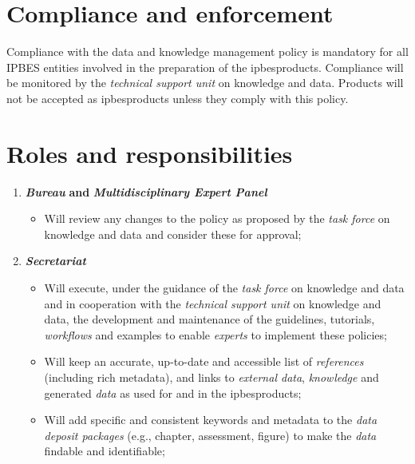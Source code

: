 \documentclass{article}
\begin{document}
\section{Compliance and enforcement}

Compliance with the data and knowledge management policy is mandatory for all IPBES entities involved in the preparation of the \gls{ipbesproducts}. Compliance will be monitored by the \textit{technical support unit} on knowledge and data. Products will not be accepted as \gls{ipbesproducts} unless they comply with this policy.

\section{Roles and responsibilities}

\begin{enumerate}[label=(\alph*)]
    \item \textit{\textbf{Bureau }}\textbf{and }\textit{\textbf{Multidisciplinary Expert Panel}}
    \begin{itemize}
        \item Will review any changes to the policy as proposed by the \textit{task force} on knowledge and data and consider these for approval;
    \end{itemize}

    \item \textit{\textbf{Secretariat}}
    \begin{itemize}
        \item Will execute, under the guidance of the \textit{task force }on knowledge and data and in cooperation with the \textit{technical support unit} on knowledge and data, the development and maintenance of the guidelines, tutorials, \textit{workflows} and examples to enable \textit{experts} to implement these policies;
        \item Will keep an accurate, up-to-date and accessible list of \textit{references} (including rich metadata), and links to \textit{external data}, \textit{knowledge }and generated \textit{data} as used for and in the \gls{ipbesproducts};
        \item Will add specific and consistent keywords and metadata to the \textit{data deposit packages} (e.g., chapter, assessment, figure) to make the \textit{data} findable and identifiable;
    \end{itemize}


\end{enumerate}
\end{document}
